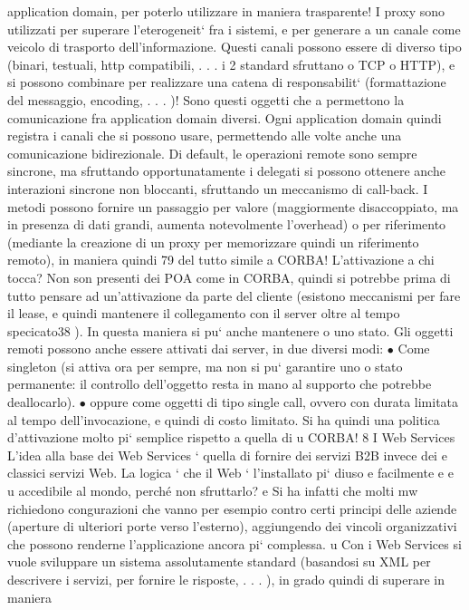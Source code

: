 \documentclass[a4paper,12pt]{article}
\begin{document}
application domain, per poterlo utilizzare in
maniera trasparente!
I proxy sono utilizzati per superare l'eterogeneit` fra i sistemi, e per generare
a
un canale come veicolo di trasporto dell'informazione. Questi canali possono essere di diverso tipo (binari, testuali,
http compatibili, . . . i 2 standard sfruttano
o TCP o HTTP), e si possono combinare per realizzare una catena di responsabilit` (formattazione del messaggio,
encoding, . . . )! Sono questi oggetti che
a
permettono la comunicazione fra application domain diversi. Ogni application
domain quindi registra i canali che si possono usare, permettendo alle volte anche una comunicazione bidirezionale.
Di default, le operazioni remote sono sempre sincrone, ma sfruttando opportunatamente i delegati si possono ottenere
anche interazioni sincrone non
bloccanti, sfruttando un meccanismo di call-back. I metodi possono fornire un
passaggio per valore (maggiormente disaccoppiato, ma in presenza di dati grandi, aumenta notevolmente l'overhead) o per
riferimento (mediante la creazione
di un proxy per memorizzare quindi un riferimento remoto), in maniera quindi
79
\newpage
del tutto simile a CORBA!
L'attivazione a chi tocca? Non son presenti dei POA come in CORBA,
quindi si potrebbe prima di tutto pensare ad un'attivazione da parte del cliente
(esistono meccanismi per fare il lease, e quindi mantenere il collegamento con il
server oltre al tempo specicato38 ). In questa maniera si pu` anche mantenere
o
uno stato.
Gli oggetti remoti possono anche essere attivati dai server, in due diversi
modi:
$\bullet$ Come singleton (si attiva ora per sempre, ma non si pu` garantire uno
o
stato permanente: il controllo dell'oggetto resta in mano al supporto che
potrebbe deallocarlo).
$\bullet$ oppure come oggetti di tipo single call, ovvero con durata limitata al tempo
dell'invocazione, e quindi di costo limitato.
Si ha quindi una politica d'attivazione molto pi` semplice rispetto a quella di
u
CORBA!
8
I Web Services
L'idea alla base dei Web Services ` quella di fornire dei servizi B2B invece dei
e
classici servizi Web. La logica ` che il Web ` l'installato pi` diuso e facilmente
e
e
u
accedibile al mondo, perché non sfruttarlo?
e
Si ha infatti che molti mw richiedono congurazioni che vanno per esempio
contro certi principi delle aziende (aperture di ulteriori porte verso l'esterno),
aggiungendo dei vincoli organizzativi che possono renderne l'applicazione ancora
pi` complessa.
u
Con i Web Services si vuole sviluppare un sistema assolutamente standard
(basandosi su XML per descrivere i servizi, per fornire le risposte, . . . ), in grado quindi di superare in maniera
\end{document}
